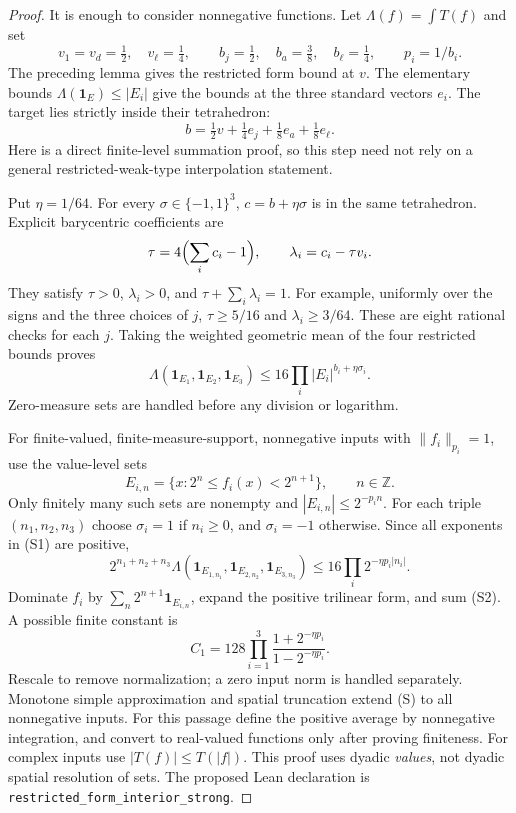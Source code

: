 \documentclass[11pt]{article}
\begin{document}
\begin{proof}
It is enough to consider nonnegative functions. Let
$\Lambda(f)=\int T(f)$ and set
\[
 v_1=v_d=\tfrac12,\quad v_\ell=\tfrac14,
 \qquad b_j=\tfrac12,\quad b_a=\tfrac38,\quad b_\ell=\tfrac14,
 \qquad p_i=1/b_i.
\]
The preceding lemma gives the restricted form bound at $v$. The elementary
bounds $\Lambda(\mathbf1_E)\leq |E_i|$ give the bounds at the three standard
vectors $e_i$. The target lies strictly inside their tetrahedron:
\[
 b=\tfrac12v+\tfrac14 e_j+\tfrac18e_a+\tfrac18e_\ell.
\]
Here is a direct finite-level summation proof, so this step need not rely
on a general restricted-weak-type interpolation statement.

Put $\eta=1/64$. For every $\sigma\in\{-1,1\}^3$, $c=b+\eta\sigma$ is in
the same tetrahedron. Explicit barycentric coefficients are
\[
 \tau=4\Bigl(\sum_i c_i-1\Bigr),\qquad
 \lambda_i=c_i-\tau v_i.
\]
They satisfy $\tau>0$, $\lambda_i>0$, and $\tau+\sum_i\lambda_i=1$.
For example, uniformly over the signs and the three choices of $j$,
$\tau\geq5/16$ and $\lambda_i\geq3/64$. These are eight rational checks
for each $j$. Taking the weighted geometric mean of the four restricted
bounds proves
\[
 \Lambda(\mathbf1_{E_1},\mathbf1_{E_2},\mathbf1_{E_3})
 \leq16\prod_i|E_i|^{b_i+\eta\sigma_i}.             \tag{S1}
\]
Zero-measure sets are handled before any division or logarithm.

For finite-valued, finite-measure-support, nonnegative inputs with
$\|f_i\|_{p_i}=1$, use the value-level sets
\[
 E_{i,n}=\{x:2^n\leq f_i(x)<2^{n+1}\},\qquad n\in\mathbb Z.
\]
Only finitely many such sets are nonempty and
$|E_{i,n}|\leq2^{-p_i n}$. For each triple $(n_1,n_2,n_3)$ choose
$\sigma_i=1$ if $n_i\geq0$, and $\sigma_i=-1$ otherwise.
Since all exponents in (S1) are positive,
\[
 2^{n_1+n_2+n_3}\Lambda(\mathbf1_{E_{1,n_1}},
     \mathbf1_{E_{2,n_2}},\mathbf1_{E_{3,n_3}})
 \leq16\prod_i2^{-\eta p_i|n_i|}.                  \tag{S2}
\]
Dominate $f_i$ by $\sum_n2^{n+1}\mathbf1_{E_{i,n}}$, expand the positive
trilinear form, and sum (S2). A possible finite constant is
\[
 C_1=128\prod_{i=1}^3
       \frac{1+2^{-\eta p_i}}{1-2^{-\eta p_i}}.
\]
Rescale to remove normalization; a zero input norm is handled separately.
Monotone simple approximation and spatial truncation extend (S) to all
nonnegative inputs. For this passage define the positive average by nonnegative
integration, and convert to real-valued functions only after proving finiteness.
For complex inputs use $|T(f)|\leq T(|f|)$.
This proof uses dyadic \emph{values}, not dyadic spatial resolution of sets.
The proposed Lean declaration is
\texttt{restricted\_form\_interior\_strong}.
\end{proof}
\end{document}
